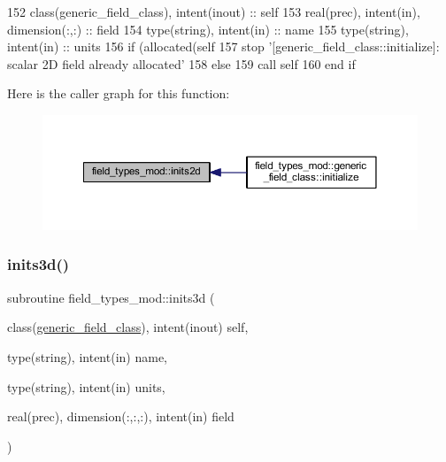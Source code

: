 \begin{DoxyCode}
152     \textcolor{keywordtype}{class}(generic\_field\_class), \textcolor{keywordtype}{intent(inout)} :: self
153     \textcolor{keywordtype}{real(prec)}, \textcolor{keywordtype}{intent(in)}, \textcolor{keywordtype}{dimension(:,:)} :: field
154     \textcolor{keywordtype}{type}(string), \textcolor{keywordtype}{intent(in)} :: name
155     \textcolor{keywordtype}{type}(string), \textcolor{keywordtype}{intent(in)} :: units
156     \textcolor{keywordflow}{if} (\textcolor{keyword}{allocated}(self%
157         stop \textcolor{stringliteral}{'[generic\_field\_class::initialize]: scalar 2D field already allocated'}
158     \textcolor{keywordflow}{else}
159         \textcolor{keyword}{call }self%
160 \textcolor{keywordflow}{    end if}
\end{DoxyCode}
Here is the caller graph for this function\+:\nopagebreak
\begin{figure}[H]
\begin{center}
\leavevmode
\includegraphics[width=350pt]{namespacefield__types__mod_a55a57c6fa8c785a5f529ca577a677845_icgraph}
\end{center}
\end{figure}
\mbox{\label{namespacefield__types__mod_ac3c3c9514102272c69299be06deabbcd}} 
\subsubsection{\texorpdfstring{inits3d()}{inits3d()}}
{\footnotesize\ttfamily subroutine field\+\_\+types\+\_\+mod\+::inits3d (\begin{DoxyParamCaption}\item[{class(\mbox{\hyperlink{structfield__types__mod_1_1generic__field__class}{generic\+\_\+field\+\_\+class}}), intent(inout)}]{self,  }\item[{type(string), intent(in)}]{name,  }\item[{type(string), intent(in)}]{units,  }\item[{real(prec), dimension(\+:,\+:,\+:), intent(in)}]{field }\end{DoxyParamCaption})\hspace{0.3cm}{\ttfamily [private]}}



